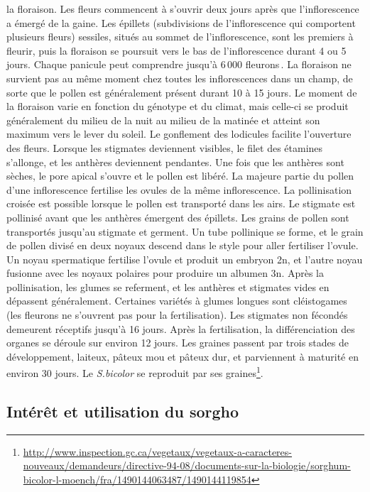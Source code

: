 \documentclass[a4paper,11pt]{article}
\begin{document}
la floraison. Les fleurs commencent à s’ouvrir deux jours après que
l’inflorescence a émergé de la gaine. Les épillets (subdivisions de
l’inflorescence qui comportent plusieurs fleurs) sessiles, situés au
sommet de l’inflorescence, sont les premiers à fleurir, puis la
floraison se poursuit vers le bas de l’inflorescence durant 4 ou 5
jours. Chaque panicule peut comprendre jusqu’à 6\,000
fleurons\,\cite{QUINBYKARPER_1947}. La floraison ne survient pas au
même moment chez toutes les inflorescences dans un champ, de sorte que
le pollen est généralement présent durant 10 à 15 jours. Le moment de
la floraison varie en fonction du génotype et du climat, mais celle-ci
se produit généralement du milieu de la nuit au milieu de la matinée
et atteint son maximum vers le lever du soleil. Le gonflement des
lodicules facilite l’ouverture des fleurs. Lorsque les stigmates
deviennent visibles, le filet des étamines s’allonge, et les anthères
deviennent pendantes. Une fois que les anthères sont sèches, le pore
apical s’ouvre et le pollen est libéré. La majeure partie du pollen
d’une inflorescence fertilise les ovules de la même inflorescence. La
pollinisation croisée est possible lorsque le pollen est transporté
dans les airs. Le stigmate est pollinisé avant que les anthères
émergent des épillets. Les grains de pollen sont transportés jusqu’au
stigmate et germent. Un tube pollinique se forme, et le grain de
pollen divisé en deux noyaux descend dans le style pour aller
fertiliser l’ovule. Un noyau spermatique fertilise l’ovule et produit
un embryon 2n, et l’autre noyau fusionne avec les noyaux polaires pour
produire un albumen 3n. Après la pollinisation, les glumes se
referment, et les anthères et stigmates vides en dépassent
généralement. Certaines variétés à glumes longues sont cléistogames
(les fleurons ne s’ouvrent pas pour la fertilisation). Les stigmates
non fécondés demeurent réceptifs jusqu’à 16 jours. Après la
fertilisation, la différenciation des organes se déroule sur environ
12 jours. Les graines passent par trois stades de développement,
laiteux, pâteux mou et pâteux dur, et parviennent à maturité en
environ 30 jours. Le \emph{S.bicolor} se reproduit par ses
graines\footnote{\url{http://www.inspection.gc.ca/vegetaux/vegetaux-a-caracteres-nouveaux/demandeurs/directive-94-08/documents-sur-la-biologie/sorghum-bicolor-l-moench/fra/1490144063487/1490144119854}}.


\subsection{Intérêt et utilisation du sorgho}
\end{document}
